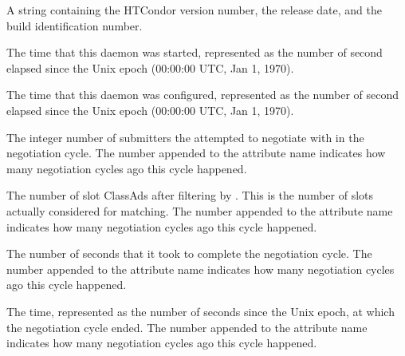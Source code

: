 \begin{description}

\item[\AdAttr{CondorVersion}:] A string containing the HTCondor version
number, the release date, and the build identification number.

\item[\AdAttr{DaemonStartTime}:] The time that this daemon was
started, represented as the number of second elapsed since
the Unix epoch (00:00:00 UTC, Jan 1, 1970).

\item[\AdAttr{DaemonLastReconfigTime}:] The time that this daemon was
configured, represented as the number of second elapsed since
the Unix epoch (00:00:00 UTC, Jan 1, 1970).

\label{attr:LastNegotiationCycleActiveSubmitterCount<X>}
\item[\AdAttr{LastNegotiationCycleActiveSubmitterCount<X>}:] 
The integer number of submitters
the  attempted to negotiate with in the negotiation cycle.
The number  appended to the attribute name indicates how
many negotiation cycles ago this cycle happened.

\label{attr:LastNegotiationCycleCandidateSlots<X>}
\item[\AdAttr{LastNegotiationCycleCandidateSlots<X>}:] 
The number of slot ClassAds after filtering by 
.
This is the number of slots actually considered for matching.
The number  appended to the attribute name indicates how many 
negotiation cycles ago this cycle happened.

\label{attr:LastNegotiationCycleDuration<X>}
\item[\AdAttr{LastNegotiationCycleDuration<X>}:] The number of seconds
that it took to complete the negotiation cycle.  The number 
appended to the attribute name indicates how many negotiation cycles
ago this cycle happened.

\label{attr:LastNegotiationCycleEnd<X>}
\item[\AdAttr{LastNegotiationCycleEnd<X>}:] 
The time, represented as the number of seconds since the Unix epoch,
at which the negotiation cycle ended. 
The number  appended to the attribute name 
indicates how many negotiation cycles ago this cycle happened.


\end{description}

